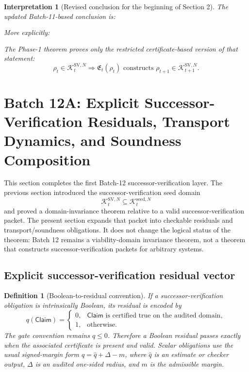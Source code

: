 \documentclass[11pt]{article}
\newtheorem{definition}[theorem]{Definition}
\newtheorem{interpretation}[theorem]{Interpretation}
\newcommand{\1}{\mathbf{1}}
\providecommand{\Kcal}{\mathcal{K}}
\begin{document}
\begin{interpretation}[Revised conclusion for the beginning of Section 2]
The updated Batch-11-based conclusion is:
\begin{center}
\end{center}
More explicitly:
\begin{center}
\end{center}
The Phase-1 theorem proves only the restricted certificate-based version of that statement:
\[
\boxed{
\rho_t\in\Kcal_t^{\mathrm{SV},N}
\Longrightarrow
\mathfrak E_t(\rho_t)
\text{ constructs }
\rho_{t+1}\in\Kcal_{t+1}^{\mathrm{SV},N}.
}
\]
\end{interpretation}


\section{Batch 12A: Explicit Successor-Verification Residuals, Transport Dynamics, and Soundness Composition}
\label{sec:batch12a_sv_residuals_transport_soundness}

This section completes the first Batch-12 successor-verification layer.  The previous section introduced the successor-verification seed domain
\[
\Kcal_t^{\mathrm{SV},N}\subseteq\Kcal_t^{\mathrm{seed},N}
\]
and proved a domain-invariance theorem relative to a valid successor-verification packet.  The present section expands that packet into checkable residuals and transport/soundness obligations.  It does not change the logical status of the theorem: Batch 12 remains a viability-domain invariance theorem, not a theorem that constructs successor-verification packets for arbitrary systems.

\subsection{Explicit successor-verification residual vector}

\begin{definition}[Boolean-to-residual convention]
\label{def:batch12a_boolean_to_residual_convention}
If a successor-verification obligation is intrinsically Boolean, its residual is encoded by
\[
q(\mathsf{Claim})=
\begin{cases}
0, & \mathsf{Claim}\text{ is certified true on the audited domain},\\
1, & \text{otherwise}.
\end{cases}
\]
The gate convention remains \(q\le0\).  Therefore a Boolean residual passes exactly when the associated certificate is present and valid.  Scalar obligations use the usual signed-margin form \(q=\widehat q+\Delta-m\), where \(\widehat q\) is an estimate or checker output, \(\Delta\) is an audited one-sided radius, and \(m\) is the admissible margin.
\end{definition}
\end{document}
